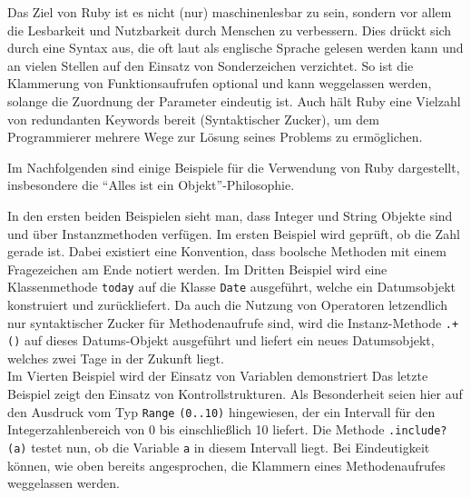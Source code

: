 Das Ziel von Ruby ist es nicht (nur) maschinenlesbar zu sein, sondern vor allem die Lesbarkeit und Nutzbarkeit durch Menschen zu verbessern. Dies drückt sich durch eine Syntax aus, die oft laut als englische Sprache gelesen werden kann und an vielen Stellen auf den Einsatz von Sonderzeichen verzichtet. So ist die Klammerung von Funktionsaufrufen optional und kann weggelassen werden, solange die Zuordnung der Parameter eindeutig ist. Auch hält Ruby eine Vielzahl von redundanten Keywords bereit (Syntaktischer Zucker), um dem Programmierer mehrere Wege zur Lösung seines Problems zu ermöglichen.

\setlength{\epigraphwidth}{\marginparwidth}
\setlength{\epigraphwidth}{0.8\textwidth}

Im Nachfolgenden sind einige Beispiele für die Verwendung von Ruby dargestellt, insbesondere die "`Alles ist ein Objekt"'-Philosophie.

 \begin{ruby}[label=Interaktive Ruby Sitzung (IRB)]
    
      
    
     
 \end{ruby}

In den ersten beiden Beispielen sieht man, dass Integer und String Objekte sind und über Instanzmethoden verfügen. Im ersten Beispiel wird geprüft, ob die Zahl gerade ist. Dabei existiert eine Konvention, dass boolsche Methoden mit einem Fragezeichen am Ende notiert werden. Im Dritten Beispiel wird eine Klassenmethode \texttt{today} auf die Klasse \texttt{Date} ausgeführt, welche ein Datumsobjekt konstruiert und zurückliefert. Da auch die Nutzung von Operatoren letzendlich nur syntaktischer Zucker für Methodenaufrufe sind, wird die Instanz-Methode \texttt{.+()} auf dieses Datums-Objekt ausgeführt und liefert ein neues Datumsobjekt, welches zwei Tage in der Zukunft liegt.\\
Im Vierten Beispiel wird der Einsatz von Variablen demonstriert
Das letzte Beispiel zeigt den Einsatz von Kontrollstrukturen. Als Besonderheit seien hier auf den Ausdruck vom Typ \texttt{Range} \texttt{(0..10)} hingewiesen, der ein Intervall für den Integerzahlenbereich von 0 bis einschließlich 10 liefert. Die Methode \texttt{.include?(a)} testet nun, ob die Variable \texttt{a} in diesem Intervall liegt. Bei Eindeutigkeit können, wie oben bereits angesprochen, die Klammern eines Methodenaufrufes weggelassen werden.

